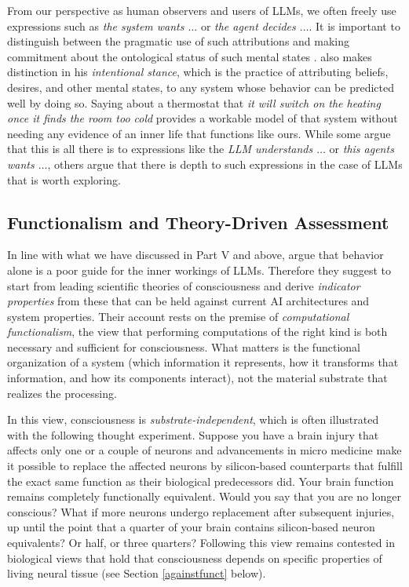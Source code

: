 From our perspective as human observers and users of LLMs, we often freely use expressions such as \emph{the system wants $\dots$} or \emph{the agent decides $\ldots$}. It is important to distinguish between the pragmatic use of such attributions and making commitment about the ontological status of such mental states \citep{van-dijk-etal-2023-large}. \citet{dennett1987intentional} also makes distinction in his \emph{intentional stance}, which is the practice of attributing beliefs, desires, and other mental states, to any system whose behavior can be predicted well by doing so. Saying about a thermostat that \emph{it will switch on the heating once it finds the room too cold} provides a workable model of that system without needing any evidence of an inner life that functions like ours. While some argue that this is all there is to expressions like the \emph{LLM understands $\ldots$} or \emph{this agents wants $\ldots$}, others argue that there is depth to such expressions in the case of LLMs that is worth exploring.

\subsection{Functionalism and Theory-Driven Assessment}
In line with what we have discussed in Part V and above, \citet{butlin2023consciousness} argue that behavior alone is a poor guide for the inner workings of LLMs. Therefore they suggest to start from leading scientific theories of consciousness and derive \emph{indicator properties} from these that can be held against current AI architectures and system properties. Their account rests on the premise of \emph{computational functionalism}, the view that performing computations of the right kind is both necessary and sufficient for consciousness. What matters is the functional organization of a system (which information it represents, how it transforms that information, and how its components interact), not the material substrate that realizes the processing. 

In this view, consciousness is \emph{substrate-independent}, which is often illustrated with the following thought experiment. Suppose you have a brain injury that affects only one or a couple of neurons and advancements in micro medicine make it possible to replace the affected neurons by silicon-based counterparts that fulfill the exact same function as their biological predecessors did. Your brain function remains completely functionally equivalent. Would you say that you are no longer conscious? What if more neurons undergo replacement after subsequent injuries, up until the point that a quarter of your brain contains silicon-based neuron equivalents? Or half, or three quarters? Following \citet{searle1980minds} this view remains contested in biological views that hold that consciousness depends on specific properties of living neural tissue (see Section \ref{againstfunct} below). 

